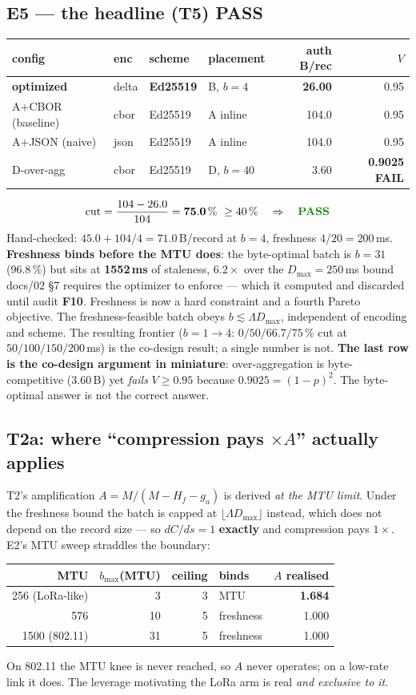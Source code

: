 \documentclass[11pt,a4paper]{article}
\newcommand{\ok}{\textcolor{green!55!black}{\textbf{PASS}}}
\newcommand{\bad}{\textcolor{red!80!black}{\textbf{FAIL}}}
\begin{document}
\subsection{E5 --- the headline (T5) \ok}
\begin{center}\begin{tabular}{llllrr}
\toprule config & enc & scheme & placement & auth B/rec & $V$ \\ \midrule
\textbf{optimized} & delta & \textbf{Ed25519} & B, $b{=}4$ & \textbf{26.00} & 0.95 \\
A+CBOR (baseline) & cbor & Ed25519 & A inline & 104.0 & 0.95 \\
A+JSON (naive) & json & Ed25519 & A inline & 104.0 & 0.95 \\
D-over-agg & cbor & Ed25519 & D, $b{=}40$ & 3.60 & \textbf{0.9025} \bad \\ \bottomrule
\end{tabular}\end{center}
\[ \text{cut}=\frac{104-26.0}{104}=\mathbf{75.0\,\%}\ \ge 40\,\%\quad\Rightarrow\quad \ok \]
Hand-checked: $45.0+104/4=71.0$\,B/record at $b{=}4$, freshness $4/20=200$\,ms.
\textbf{Freshness binds before the MTU does}: the byte-optimal batch is $b{=}31$ (96.8\,\%) but sits
at \textbf{1552\,ms} of staleness, $6.2\times$ over the $D_{\max}{=}250$\,ms bound docs/02 §7
requires the optimizer to enforce --- which it computed and discarded until audit \textbf{F10}.
Freshness is now a hard constraint and a fourth Pareto objective. The freshness-feasible batch obeys
$b\lesssim\Lambda D_{\max}$, independent of encoding and scheme. The resulting frontier
($b{=}1{\rightarrow}4$: $0/50/66.7/75\,\%$ cut at $50/100/150/200$\,ms) is the co-design result;
a single number is not. \textbf{The last row is the co-design argument in
miniature}: over-aggregation is byte-competitive (3.60\,B) yet \emph{fails} $V\ge0.95$ because
$0.9025=(1-p)^2$. The byte-optimal answer is not the correct answer.

\subsection{T2a: where ``compression pays $\times A$'' actually applies}
T2's amplification $A=M/(M-H_f-g_a)$ is derived \emph{at the MTU limit}. Under the freshness bound
the batch is capped at $\lfloor\Lambda D_{\max}\rfloor$ instead, which does not depend on the record
size --- so $dC/ds=1$ \textbf{exactly} and compression pays $1\times$. E2's MTU sweep straddles the
boundary:
\begin{center}\begin{tabular}{rrrl r}
\toprule MTU & $b_{\max}$(MTU) & ceiling & binds & $A$ realised \\ \midrule
256 (LoRa-like) & 3 & 3 & MTU & \textbf{1.684} \\
576 & 10 & 5 & freshness & 1.000 \\
1500 (802.11) & 31 & 5 & freshness & 1.000 \\ \bottomrule
\end{tabular}\end{center}
On 802.11 the MTU knee is never reached, so $A$ never operates; on a low-rate link it does. The
leverage motivating the LoRa arm is real \emph{and exclusive to it}.
\end{document}
